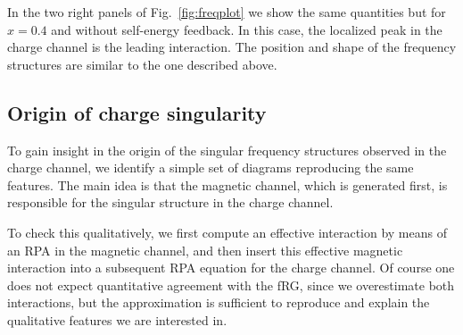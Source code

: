 In the two right panels of Fig.~\ref{fig:freqplot} we show the same quantities but for $x=0.4$ and without self-energy feedback. In this case, the localized peak in the charge channel is the leading interaction. The position and shape of the frequency structures are similar to the one described above.

\subsection{Origin of charge singularity} 
\label{sec:OrOfChSi}
To gain insight in the origin of the singular frequency structures observed in the charge channel, we identify a simple set of diagrams reproducing the same features.   
The main idea is that the magnetic channel, which is generated first, is responsible for the singular structure in the charge channel. 

To check this qualitatively, we first compute an effective interaction by means of an RPA in the magnetic channel, and then insert this effective magnetic interaction into a subsequent RPA equation for the charge channel. 
Of course one does not expect quantitative agreement with the fRG, since we overestimate both interactions, but the approximation is sufficient to reproduce and explain the qualitative features we are interested in.  
  
